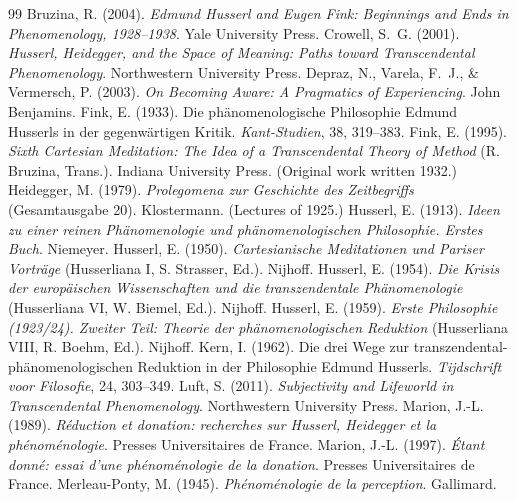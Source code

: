 \documentclass{situationist-preprint}
\begin{document}
\begin{thebibliography}{99}\small
{} Bruzina, R. (2004). \emph{Edmund Husserl and Eugen Fink: Beginnings and Ends in Phenomenology, 1928--1938}. Yale University Press.
 Crowell, S.~G. (2001). \emph{Husserl, Heidegger, and the Space of Meaning: Paths toward Transcendental Phenomenology}. Northwestern University Press.
 Depraz, N., Varela, F.~J., \& Vermersch, P. (2003). \emph{On Becoming Aware: A Pragmatics of Experiencing}. John Benjamins.
 Fink, E. (1933). Die phänomenologische Philosophie Edmund Husserls in der gegenwärtigen Kritik. \emph{Kant-Studien}, 38, 319--383.
 Fink, E. (1995). \emph{Sixth Cartesian Meditation: The Idea of a Transcendental Theory of Method} (R. Bruzina, Trans.). Indiana University Press. (Original work written 1932.)
 Heidegger, M. (1979). \emph{Prolegomena zur Geschichte des Zeitbegriffs} (Gesamtausgabe 20). Klostermann. (Lectures of 1925.)
 Husserl, E. (1913). \emph{Ideen zu einer reinen Phänomenologie und phänomenologischen Philosophie. Erstes Buch}. Niemeyer.
 Husserl, E. (1950). \emph{Cartesianische Meditationen und Pariser Vorträge} (Husserliana I, S. Strasser, Ed.). Nijhoff.
 Husserl, E. (1954). \emph{Die Krisis der europäischen Wissenschaften und die transzendentale Phänomenologie} (Husserliana VI, W. Biemel, Ed.). Nijhoff.
 Husserl, E. (1959). \emph{Erste Philosophie (1923/24). Zweiter Teil: Theorie der phänomenologischen Reduktion} (Husserliana VIII, R. Boehm, Ed.). Nijhoff.
 Kern, I. (1962). Die drei Wege zur transzendental-phänomenologischen Reduktion in der Philosophie Edmund Husserls. \emph{Tijdschrift voor Filosofie}, 24, 303--349.
 Luft, S. (2011). \emph{Subjectivity and Lifeworld in Transcendental Phenomenology}. Northwestern University Press.
 Marion, J.-L. (1989). \emph{Réduction et donation: recherches sur Husserl, Heidegger et la phénoménologie}. Presses Universitaires de France.
 Marion, J.-L. (1997). \emph{Étant donné: essai d'une phénoménologie de la donation}. Presses Universitaires de France.
 Merleau-Ponty, M. (1945). \emph{Phénoménologie de la perception}. Gallimard.

\end{thebibliography}
\end{document}
